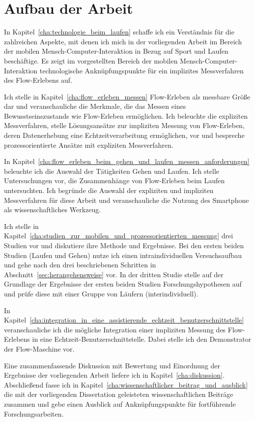 

\section{Aufbau der Arbeit} 

\label{sec:aufbau_der_arbeit}

In Kapitel~\ref{cha:technologie_beim_laufen} schaffe ich ein Verständnis für die zahlreichen Aspekte, mit denen ich mich in der vorliegenden Arbeit im Bereich der mobilen Mensch-Computer-Interaktion in Bezug auf Sport und Laufen beschäftige. Es zeigt im vorgestellten Bereich der mobilen Mensch-Computer-Interaktion technologische Anknüpfungspunkte für ein implizites Messverfahren des Flow-Erlebens auf.

Ich stelle in Kapitel~\ref{cha:flow_erleben_messen} Flow-Erleben als messbare Größe dar und veranschauliche die Merkmale, die das Messen eines Bewusstseinszustands wie Flow-Erleben ermöglichen. Ich beleuchte die expliziten Messverfahren, stelle Lösungsansätze zur impliziten Messung von Flow-Erleben, deren Datenerhebung eine Echtzeitverarbeitung ermöglichen, vor und bespreche prozessorientierte Ansätze mit expliziten Messverfahren.

In Kapitel~\ref{cha:flow_erleben_beim_gehen_und_laufen_messen_anforderungen} beleuchte ich die Auswahl der Tätigkeiten Gehen und Laufen. Ich stelle Untersuchungen vor, die Zusammenhänge von Flow-Erleben beim Laufen untersuchten. Ich begründe die Auswahl der expliziten und impliziten Messverfahren für diese Arbeit und veranschauliche die Nutzung des Smartphone als wissenschaftliches Werkzeug.

Ich stelle in Kapitel~\ref{cha:studien_zur_mobilen_und_prozessorientierten_messung} drei Studien vor und diskutiere ihre Methode und Ergebnisse. Bei den ersten beiden Studien (Laufen und Gehen) nutze ich einen intraindividuellen Versuchsaufbau und gehe nach den drei beschriebenen Schritten in Abschnitt~\ref{sec:herangehensweise} vor. In der dritten Studie stelle auf der Grundlage der Ergebnisse der ersten beiden Studien Forschungshypothesen auf und prüfe diese mit einer Gruppe von Läufern (interindividuell).

In Kapitel~\ref{cha:integration_in_eine_assistierende_echtzeit_benutzerschnittstelle} veranschauliche ich die mögliche Integration einer impliziten Messung des Flow-Erlebens in eine Echtzeit-Benutzerschnittstelle. Dabei stelle ich den Demonstrator der Flow-Maschine vor.

Eine zusammenfassende Diskussion mit Bewertung und Einordnung der Ergebnisse der vorliegenden Arbeit liefere ich in Kapitel~\ref{cha:diskussion}. Abschließend fasse ich in Kapitel~\ref{cha:wissenschaftlicher_beitrag_und_ausblick} die mit der vorliegenden Dissertation geleisteten wissenschaftlichen Beiträge zusammen und gebe einen Ausblick auf Anknüpfungspunkte für fortführende Forschungsarbeiten.

